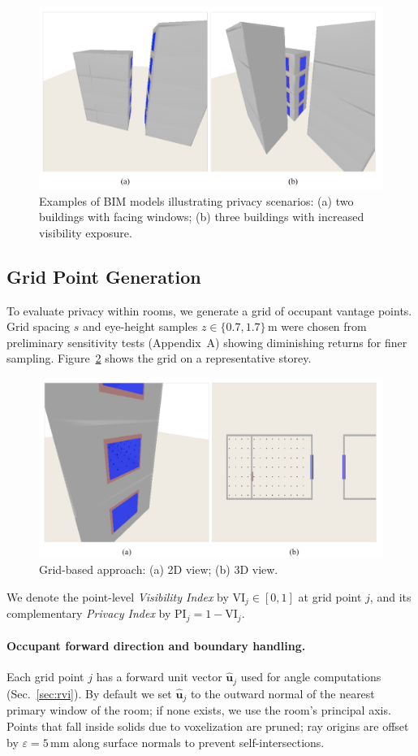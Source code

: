 \documentclass[final,3p,times,review]{elsarticle}
\begin{document}
\begin{figure}[ht!]
    \centering
    \includegraphics[width=0.6\linewidth]{bim_models.jpg}
    \caption{Examples of BIM models illustrating privacy scenarios: (a) two buildings with facing windows; (b) three buildings with increased visibility exposure.}
    \label{fig:bim_models}
\end{figure}


\subsection{Grid Point Generation}
To evaluate privacy within rooms, we generate a grid of occupant vantage points. Grid spacing $s$ and eye-height samples $z \in \{0.7,1.7\}\,\text{m}$ were chosen from preliminary sensitivity tests (Appendix~A) showing diminishing returns for finer sampling. Figure~\ref{fig:griding} shows the grid on a representative storey.

\begin{figure}[H]
\centering
\includegraphics[width=.6\textwidth]{Grid_based_appraoch.jpg} %
\caption{Grid-based approach: (a) 2D view; (b) 3D view.}
\label{fig:griding}
\end{figure}

We denote the point-level \emph{Visibility Index} by $\mathrm{VI}_j\in[0,1]$ at grid point $j$, and its complementary \emph{Privacy Index} by $\mathrm{PI}_j = 1 - \mathrm{VI}_j$.

\paragraph{Occupant forward direction and boundary handling.}
Each grid point $j$ has a forward unit vector $\hat{\mathbf{u}}_j$ used for angle computations (Sec.~\ref{sec:rvi}). By default we set $\hat{\mathbf{u}}_j$ to the outward normal of the nearest primary window of the room; if none exists, we use the room’s principal axis. Points that fall inside solids due to voxelization are pruned; ray origins are offset by $\varepsilon=5$\,mm along surface normals to prevent self-intersections.
\end{document}
